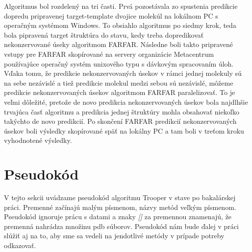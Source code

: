 \indent Algoritmus bol rozdelený na tri časti. Prvá pozostávala zo spustenia predikcie dopredu pripravenej target-template dvojice molekúl na lokálnom PC s operačným systémom Windows. To obsiahlo algoritmus  po siedmy krok, teda bola pipravená target štruktúra do stavu, kedy treba dopredikovať nekonzervované úseky algoritmom FARFAR. Následne boli takto pripravené vstupy pre FARFAR skopírované na servery organizácie Metacentrum používajúce operačný systém unixového typu s dávkovým spracovaním úloh. Vďaka tomu, že predikcie nekonzervovaných úsekov v rámci jednej molekuly sú na sebe nezávislé a tiež predikcie molekul medzi sebou sú nezávislé, môžeme predikcie nekonzervovaných úsekov algoritmom FARFAR paralelizovať. To je veľmi dôležité, pretože de novo predikcia nekonzervovaných úsekov bola najdlhšie trvajúca časť algoritmu a predikcia jednej štruktúry mohla obsahovať niekoľko takýchto de novo predikcií.  Po skončení FARFAR predikcií nekonzervovaných úsekov boli výsledky skopírované späť na lokálny PC a tam boli v treťom kroku vyhodnotené výsledky. 


\section{Pseudokód}\label{kap3:pseudocode}
V tejto sekcii uvádzame pseudokód algoritmu Trooper v stave po bakalárskej práci. Premenné  začínajú malým písmenom, názvy metód veľkým písmenom. Pseudokód ignoruje prácu s datami a znaky \textit{[]} za premennou znamenajú, že premenná nahrádza množinu pdb súborov. Pseudokód nám bude ďalej v práci slúžiť aj na to, aby sme sa vedeli na jendotlivé metódy v prípade potreby odkazovať.


